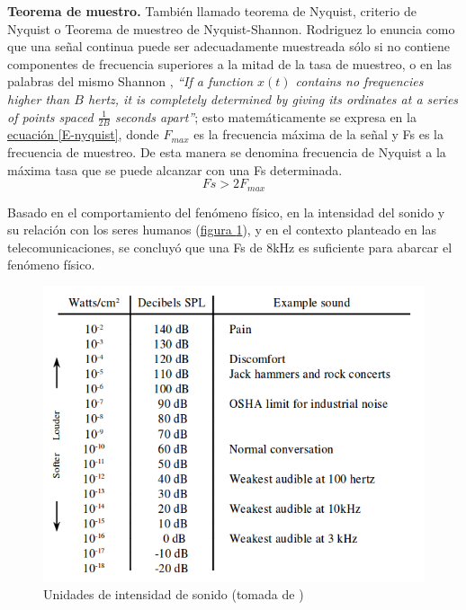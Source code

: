 \documentclass[11pt,lettersize]{article} %
\newcommand{\figura}[1]{\hyperref[{#1}]{figura \ref*{#1}}}
\newcommand{\ecuacion}[1]{\hyperref[{#1}]{ecuación \ref*{#1}}}
\begin{document}
\textbf{Teorema de muestro.}
También llamado teorema de Nyquist, criterio de Nyquist o Teorema de muestreo de Nyquist-Shannon. Rodriguez \cite{Rodriguez2012} lo enuncia como que una señal continua puede ser adecuadamente muestreada sólo si no contiene componentes de frecuencia superiores a la mitad de la tasa de muestreo, o en las palabras del mismo Shannon \cite{Shannon1949}, \textit{``If a function $x(t)$ contains no frequencies higher than $B$ hertz, it is completely determined by giving its ordinates at a series of points spaced $\frac{1}{2B}$ seconds apart''}; esto matemáticamente se expresa en la \ecuacion{E-nyquist}, donde $F_{max}$ es la frecuencia máxima de la señal y Fs es la frecuencia de muestreo. De esta manera se denomina frecuencia de Nyquist  a la máxima tasa que se puede alcanzar con una Fs determinada.
\begin{equation}
	Fs > 2F_{max}
	\label{E-nyquist}
\end{equation}

Basado en el comportamiento del fenómeno físico, en la intensidad del sonido y su relación con los seres humanos (\figura{F-intensidad}), y en el contexto planteado en las telecomunicaciones, se concluyó que una Fs de 8kHz es suficiente para abarcar el fenómeno físico.
\begin{figure}[h!]
	\centering
	\includegraphics[width=.6\textwidth]{images/intensidad-audio.png}
	\caption[Unidades de intensidad de sonido]{Unidades de intensidad de sonido (tomada de \cite{Smith1997})}
	\label{F-intensidad}
\end{figure}

\end{document}
